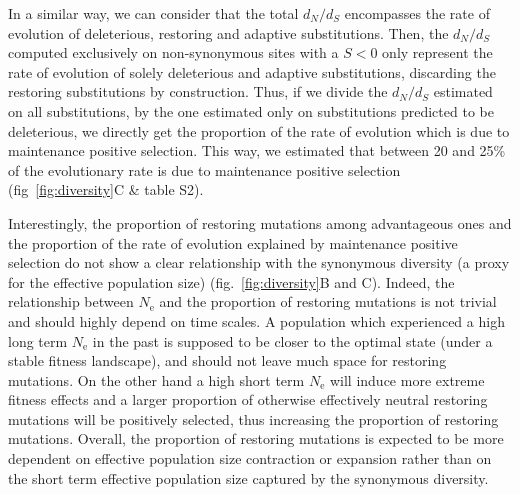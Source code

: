 \documentclass{article}
\newcommand{\Ne}{N_{\textrm{e}}}
\newcommand{\dn}{d_N}
\newcommand{\ds}{d_S}
\newcommand{\dnds}{\dn / \ds}
\newcommand{\Sphy}{S}
\begin{document}
    In a similar way, we can consider that the total $\dnds$ encompasses the rate of evolution of deleterious, restoring and adaptive substitutions.
    Then, the $\dnds$ computed exclusively on non-synonymous sites with a $\Sphy < 0$ only represent the rate of evolution of solely deleterious and adaptive substitutions, discarding the restoring substitutions by construction.
    Thus, if we divide the $\dnds$ estimated on all substitutions, by the one estimated only on substitutions predicted to be deleterious, we directly get the proportion of the rate of evolution which is due to maintenance positive selection.
    This way, we estimated that between 20 and 25\% of the evolutionary rate is due to maintenance positive selection (fig~\ref{fig:diversity}C \& table S2).

    Interestingly, the proportion of restoring mutations among advantageous ones and the proportion of the rate of evolution explained by maintenance positive selection do not show a clear relationship with the synonymous diversity (a proxy for the effective population size) (fig.~\ref{fig:diversity}B and C).
    Indeed, the relationship between $\Ne$ and the proportion of restoring mutations is not trivial and should highly depend on time scales.
    A population which experienced a high long term $\Ne$ in the past is supposed to be closer to the optimal state (under a stable fitness landscape), and should not leave much space for restoring mutations.
    On the other hand a high short term $\Ne$ will induce more extreme fitness effects and a larger proportion of otherwise effectively neutral restoring mutations will be positively selected, thus increasing the proportion of restoring mutations.
    Overall, the proportion of restoring mutations is expected to be more dependent on effective population size contraction or expansion rather than on the short term effective population size captured by the synonymous diversity.
\end{document}
